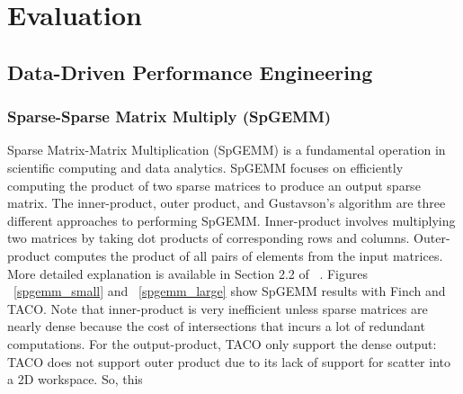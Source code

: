 
\section{Evaluation}

\subsection{Data-Driven Performance Engineering}
\subsubsection{Sparse-Sparse Matrix Multiply (SpGEMM)}

Sparse Matrix-Matrix Multiplication (SpGEMM) is a fundamental operation in scientific computing and data analytics. SpGEMM focuses on efficiently computing the product of two sparse matrices to produce an output sparse matrix.
The inner-product, outer product, and Gustavson's algorithm are three different approaches to performing SpGEMM. 
Inner-product involves multiplying two matrices by taking dot products of corresponding rows and columns.
Outer-product computes the product of all pairs of elements from the input matrices.
More detailed explanation is available in Section 2.2 of ~\cite{zhang2021gamma}.
Figures ~\ref{spgemm_small} and ~\ref{spgemm_large} show SpGEMM results with Finch and TACO.
Note that inner-product is very inefficient unless sparse matrices are nearly dense because the cost of intersections that incurs a lot of redundant computations. For the output-product, TACO only support the dense output: TACO does not support outer product due to its lack of support for scatter into a 2D workspace. So, this  








